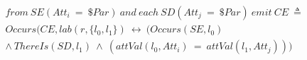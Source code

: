 \begin{align*}%
&from\ SE(Att_i\ = \ \$Par)\ and\ each\ SD(Att_j\ = \ \$Par)\ emit\ CE\ \triangleq\\
&Occurs(CE, lab(r, \{l_0, l_1\})\ \leftrightarrow\ (Occurs(SE, l_0)\\
&\wedge\ ThereIs(SD, l_1)\ \wedge\ (attVal(l_0, Att_i)\ =\ attVal(l_1, Att_j)))
\end{align*}

